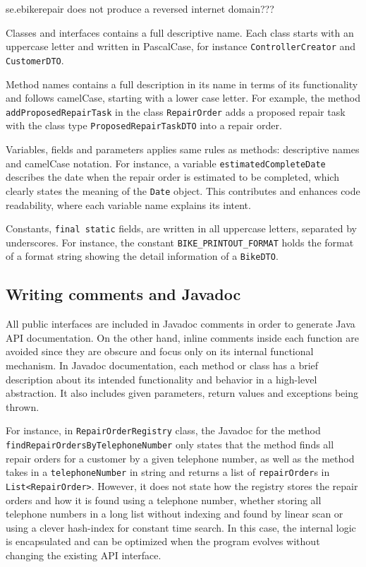 \documentclass[a4paper]{scrartcl}
\begin{document}
se.ebikerepair does not produce a reversed internet domain???

Classes and interfaces contains a full descriptive name. Each class starts with an uppercase letter and written in PascalCase, for instance \texttt{ControllerCreator} and \texttt{CustomerDTO}. 

Method names contains a full description in its name in terms of its functionality and follows camelCase, starting with a lower case letter. For example, the method \texttt{addProposedRepairTask} in the class \texttt{RepairOrder} adds a proposed repair task with the class type \texttt{ProposedRepairTaskDTO} into a repair order.

Variables, fields and parameters applies same rules as methods: descriptive names and camelCase notation. For instance, a variable \texttt{estimatedCompleteDate} describes the date when the repair order is estimated to be completed, which clearly states the meaning of the \texttt{Date} object. This contributes and enhances code readability, where each variable name explains its intent.

Constants, \texttt{final static} fields, are written in all uppercase letters, separated by underscores. For instance, the constant \texttt{BIKE\_PRINTOUT\_FORMAT} holds the format of a format string showing the detail information of a \texttt{BikeDTO}.

\subsection{Writing comments and Javadoc}

All public interfaces are included in Javadoc comments in order to generate Java API documentation. On the other hand, inline comments inside each function are avoided since they are obscure and focus only on its internal functional mechanism. In Javadoc documentation, each method or class has a brief description about its intended functionality and behavior in a high-level abstraction. It also includes given parameters, return values and exceptions being thrown.

For instance, in \texttt{RepairOrderRegistry} class, the Javadoc for the method \texttt{findRepairOrdersByTelephoneNumber} only states that the method finds all repair orders for a customer by a given telephone number, as well as the method takes in a \texttt{telephoneNumber} in string and returns a list of \texttt{repairOrder}s in \texttt{List\textless RepairOrder\textgreater}. However, it does not state how the registry stores the repair orders and how it is found using a telephone number, whether storing all telephone numbers in a long list without indexing and found by linear scan or using a clever hash-index for constant time search. In this case, the internal logic is encapsulated and can be optimized when the program evolves without changing the existing API interface.
\end{document}
